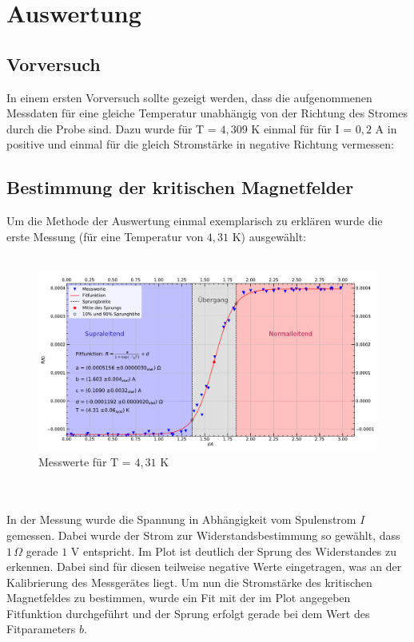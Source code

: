 \documentclass[german,  %
parskip=full,  %
]{scrartcl}
\begin{document}
\newpage
\section{Auswertung}
\subsection{Vorversuch}
In einem ersten Vorversuch sollte gezeigt werden, dass die aufgenommenen Messdaten für eine gleiche Temperatur unabhängig von der Richtung des Stromes durch die Probe sind. Dazu wurde für T = $4,309$ K einmal für für I = $0,2$ A in positive und einmal für die gleich Stromstärke in negative Richtung vermessen:
%
%
%
%
%
%
%
%
%
%
%
\subsection{Bestimmung der kritischen Magnetfelder}
Um die Methode der Auswertung einmal exemplarisch zu erklären wurde die erste Messung (für eine Temperatur von $4,31$ K) ausgewählt:
\\\\
\begin{figure}[h!]
\centering
\includegraphics[width=\textwidth]{Fitverfahren}
\caption{Messwerte für T = $4,31$ K}
\end{figure}
\\\\
In der Messung wurde die Spannung in Abhängigkeit vom Spulenstrom $I$ gemessen. Dabei wurde der Strom zur Widerstandsbestimmung so gewählt, dass $1\, \Omega$ gerade $1$ V entspricht. Im Plot ist deutlich der Sprung des Widerstandes zu erkennen. Dabei sind für diesen teilweise negative Werte eingetragen, was an der Kalibrierung des Messgerätes liegt. Um nun die Stromstärke des kritischen Magnetfeldes zu bestimmen, wurde ein Fit mit der im Plot angegeben Fitfunktion durchgeführt und der Sprung erfolgt gerade bei dem Wert des Fitparameters $b$. 
\end{document}

